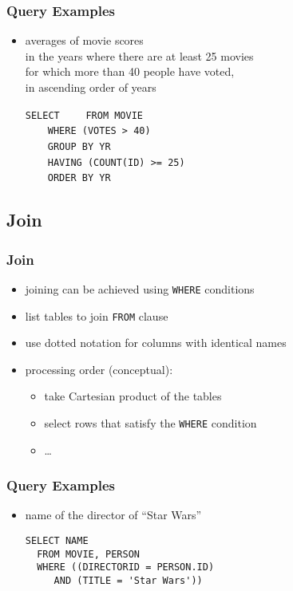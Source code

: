 \documentclass[dvipsnames]{beamer}
\theoremstyle{plain}
\begin{document}
\begin{frame}[fragile]
  \frametitle{Query Examples}

  \begin{itemize}
    \item averages of movie scores\\
      in the years where there are at least 25 movies\\
      for which more than 40 people have voted,\\
      in ascending order of years

\medskip
\lstinline!SELECT! 
~~~~\lstinline!FROM MOVIE!\\
\pause
~~~~\lstinline!WHERE (VOTES > 40)!\\
\pause
~~~~\lstinline!GROUP BY YR!\\
\pause
~~~~\lstinline!HAVING (COUNT(ID) >= 25)!\\
\pause\pause
~~~~\lstinline!ORDER BY YR!
  \end{itemize}
\end{frame}

\subsection{Join}

\begin{frame}
  \frametitle{Join}

  \begin{itemize}
    \item joining can be achieved using \lstinline!WHERE! conditions
    \item list tables to join \lstinline!FROM! clause
    \item use dotted notation for columns with identical names

    \pause
    \medskip
    \item processing order (conceptual):
    \begin{itemize}
      \item take Cartesian product of the tables
      \item select rows that satisfy the \lstinline!WHERE! condition
      \item \ldots
    \end{itemize}
  \end{itemize}
\end{frame}

\begin{frame}[fragile]
  \frametitle{Query Examples}

  \begin{itemize}
    \item name of the director of ``Star Wars''
    \begin{lstlisting}
SELECT NAME
  FROM MOVIE, PERSON
  WHERE ((DIRECTORID = PERSON.ID)
     AND (TITLE = 'Star Wars'))
    \end{lstlisting}
  \end{itemize}
\end{frame}
\end{document}
